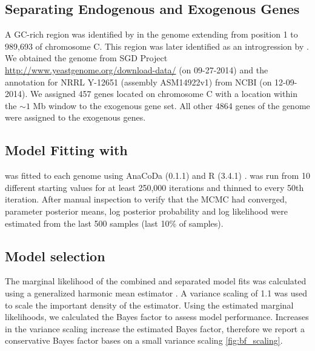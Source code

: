 \documentclass[fleqn,letterpaper]{article}
\begin{document}
\subsection*{Separating Endogenous and Exogenous Genes}
A GC-rich region was identified by \citet{payen2009} in the \kluyveri genome extending from position 1 to 989,693 of chromosome C.
This region was later identified as an introgression by \citet{friedrich2015}.
We obtained the \kluyveri genome from SGD Project \url{http://www.yeastgenome.org/download-data/} (on 09-27-2014) and the annotation for \kluyveri NRRL Y-12651 (assembly ASM14922v1) from NCBI (on 12-09-2014).
We assigned 457 genes located on chromosome C with a location within the $\sim 1$ Mb window to the exogenous gene set.
All other 4864 genes of the \kluyveri genome were assigned to the exogenous genes.

\subsection*{Model Fitting with \ROC}
\ROC was fitted to each genome using AnaCoDa (0.1.1) \citep{landerer2018} and R (3.4.1) \citep{rcore}.
\ROC was run from 10 different starting values for at least 250,000 iterations and thinned to every 50th iteration.
After manual inspection to verify that the MCMC had converged, parameter posterior means, log posterior probability and log likelihood were estimated from the last 500 samples (last 10\% of samples).

\subsection*{Model selection}
The marginal likelihood of the combined and separated model fits was calculated using a generalized harmonic mean estimator \citep{Gronau2017}. A variance scaling of 1.1 was used to scale the important density of the estimator. Using the estimated marginal likelihoods, we calculated the Bayes factor to assess model performance. 
Increases in the variance scaling increase the estimated Bayes factor, therefore we report a conservative Bayes factor bases on a small variance scaling \ref{fig:bf_scaling}.
\end{document}

